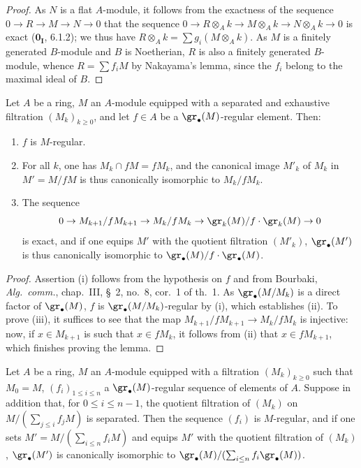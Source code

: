 \begin{proof}
As $N$ is a flat $A$-module, it follows from the exactness of the sequence $0\to R\to M\to N\to 0$ that the sequence $0\to R\otimes_Ak\to M\otimes_Ak\to N\otimes_Ak\to 0$ is exact ($\mathbf{0_I}$, 6.1.2);
we thus have $R\otimes_Ak=\sum g_i(M\otimes_Ak)$.
As $M$ is a finitely generated $B$-module and $B$ is Noetherian, $R$ is also a finitely generated $B$-module, whence $R=\sum f_iM$ by Nakayama's lemma, since the $f_i$ belong to the maximal ideal of $B$.
\end{proof}

\begin{lemma}[15.1.18]
\label{0.15.1.18}
Let $A$ be a ring, $M$ an $A$-module equipped with a separated and exhaustive filtration $(M_k)_{k\geq 0}$, and let $f\in A$ be a $\gr_\bullet(M)$-regular element.
Then:
\begin{enumerate}
  \item[(i)] $f$ is $M$-regular.
  \item[(ii)] For all $k$, one has $M_k\cap fM=fM_k$, and the canonical image $M'_k$ of $M_k$ in $M'=M/fM$ is thus canonically isomorphic to $M_k/fM_k$.
  \item[(iii)] The sequence
  \[
    0 \to M_{k+1}/fM_{k+1} \to M_k/fM_k \to \gr_k(M)/f\cdot\gr_k(M) \to 0
  \]
  is exact, and if one equips $M'$ with the quotient filtration $(M'_k)$, $\gr_\bullet(M')$ is thus canonically isomorphic to $\gr_\bullet(M)/f\cdot\gr_\bullet(M)$.
\end{enumerate}
\end{lemma}

\begin{proof}
Assertion (i) follows from the hypothesis on $f$ and from Bourbaki, \emph{Alg.~comm.}, chap.~III, \S~2, no.~8, cor.~1 of th.~1.
As $\gr_\bullet(M/M_k)$ is a direct factor of $\gr_\bullet(M)$, $f$ is $\gr_\bullet(M/M_k)$-regular by (i), which establishes (ii).
To prove (iii), it suffices to see that the map $M_{k+1}/fM_{k+1}\to M_k/fM_k$ is injective:
now, if $x\in M_{k+1}$ is such that $x\in fM_k$, it follows from (ii) that $x\in fM_{k+1}$, which finishes proving the lemma.
\end{proof}

\begin{proposition}[15.1.19]
\label{0.15.1.19}
Let $A$ be a ring, $M$ an $A$-module equipped with a filtration $(M_k)_{k\geq 0}$ such that $M_0=M$, $(f_i)_{1\leq i\leq n}$ a $\gr_\bullet(M)$-regular sequence of elements of $A$.
Suppose in addition that, for $0\leq i\leq n-1$, the quotient filtration of $(M_k)$ on $M/(\sum_{j\leq i}f_jM)$ is separated.
Then the sequence $(f_i)$ is $M$-regular, and if one sets $M'=M/(\sum_{i\leq n}f_iM)$ and equips $M'$ with the quotient filtration of $(M_k)$, $\gr_\bullet(M')$ is canonically isomorphic to $\gr_\bullet(M)/(\sum_{i\leq n}f_i\gr_\bullet(M))$.
\end{proposition}

